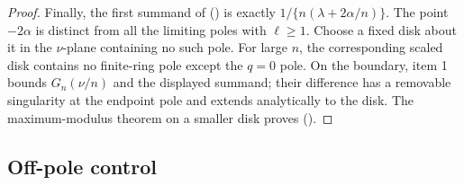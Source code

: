 \documentclass[twoside,10pt]{article}
\numberwithin{equation}{section}
\theoremstyle{slbody}
\theoremstyle{definition}
\theoremstyle{remark}
\renewcommand{\eqref}[1]{%
  \textup{{\normalfont(\oldstylenums{\ref{#1}}}\normalfont)}}
\begin{document}
\begin{proof}
Finally, the first summand of \eqref{eq:Gfinite} is exactly
$1/\{n(\lambda+2\alpha/n)\}$.  The point $-2\alpha$ is distinct from
all the limiting poles with $\ell\ge1$.  Choose a fixed disk about it in
the $\nu$-plane containing no such pole.  For large $n$, the corresponding
scaled disk contains no finite-ring pole except the $q=0$ pole.  On the
boundary, item 1 bounds $G_n(\nu/n)$ and the displayed summand; their
difference has a removable singularity at the endpoint pole and extends
analytically to the disk.  The maximum-modulus theorem on a smaller disk
proves
\eqref{eq:critical-endpoint-green}.
\end{proof}

\subsection{Off-pole control}
\end{document}
